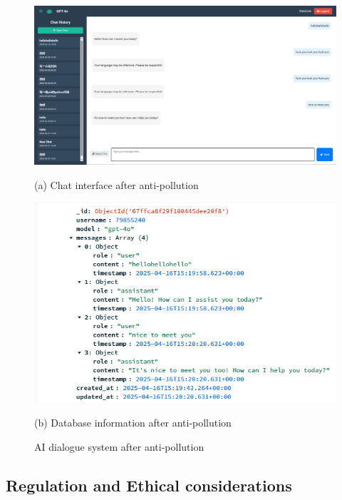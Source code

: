 \documentclass{article}
\begin{document}
\begin{enumerate}
\begin{figure}[htb]
    \begin{minipage}{0.5\textwidth}
        \centering
        \includegraphics[width=\textwidth]{images/Chat_interface_after_anti_pollution.png}
        \caption*{(a) Chat interface after anti-pollution}
    \end{minipage}
    \hfill
    \begin{minipage}{0.5\textwidth}
        \centering
        \includegraphics[width=\textwidth]{images/Database_information_after_anti_pollution.png}
        \caption*{(b) Database information after anti-pollution}
    \end{minipage}
    \caption{AI dialogue system after anti-pollution}
    \label{fig:pollution}
\end{figure}
\end{enumerate}



\subsection{Regulation and Ethical considerations}
\end{document}
